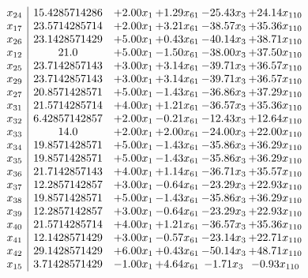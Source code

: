 \documentclass[8pt]{article}
\begin{document}
\[\begin{array}{c| c c@{\hskip 2pt} c@{\hskip 2pt} c@{\hskip 2pt} c@{\hskip 2pt} }
 x_{24}   &  15.4285714286 & +  2.00 x_{1} & +  1.29 x_{61} & -25.43 x_{3} & + 24.14 x_{110}\\
 x_{17}   &  23.5714285714 & +  2.00 x_{1} & +  3.21 x_{61} & -38.57 x_{3} & + 35.36 x_{110}\\
 x_{26}   &  23.1428571429 & +  5.00 x_{1} & +  0.43 x_{61} & -40.14 x_{3} & + 38.71 x_{110}\\
 x_{12}   &  21.0 & +  5.00 x_{1} & -1.50 x_{61} & -38.00 x_{3} & + 37.50 x_{110}\\
 x_{25}   &  23.7142857143 & +  3.00 x_{1} & +  3.14 x_{61} & -39.71 x_{3} & + 36.57 x_{110}\\
 x_{29}   &  23.7142857143 & +  3.00 x_{1} & +  3.14 x_{61} & -39.71 x_{3} & + 36.57 x_{110}\\
 x_{27}   &  20.8571428571 & +  5.00 x_{1} & -1.43 x_{61} & -36.86 x_{3} & + 37.29 x_{110}\\
 x_{31}   &  21.5714285714 & +  4.00 x_{1} & +  1.21 x_{61} & -36.57 x_{3} & + 35.36 x_{110}\\
 x_{32}   &  6.42857142857 & +  2.00 x_{1} & -0.21 x_{61} & -12.43 x_{3} & + 12.64 x_{110}\\
 x_{33}   &  14.0 & +  2.00 x_{1} & +  2.00 x_{61} & -24.00 x_{3} & + 22.00 x_{110}\\
 x_{34}   &  19.8571428571 & +  5.00 x_{1} & -1.43 x_{61} & -35.86 x_{3} & + 36.29 x_{110}\\
 x_{35}   &  19.8571428571 & +  5.00 x_{1} & -1.43 x_{61} & -35.86 x_{3} & + 36.29 x_{110}\\
 x_{36}   &  21.7142857143 & +  4.00 x_{1} & +  1.14 x_{61} & -36.71 x_{3} & + 35.57 x_{110}\\
 x_{37}   &  12.2857142857 & +  3.00 x_{1} & -0.64 x_{61} & -23.29 x_{3} & + 22.93 x_{110}\\
 x_{38}   &  19.8571428571 & +  5.00 x_{1} & -1.43 x_{61} & -35.86 x_{3} & + 36.29 x_{110}\\
 x_{39}   &  12.2857142857 & +  3.00 x_{1} & -0.64 x_{61} & -23.29 x_{3} & + 22.93 x_{110}\\
 x_{40}   &  21.5714285714 & +  4.00 x_{1} & +  1.21 x_{61} & -36.57 x_{3} & + 35.36 x_{110}\\
 x_{41}   &  12.1428571429 & +  3.00 x_{1} & -0.57 x_{61} & -23.14 x_{3} & + 22.71 x_{110}\\
 x_{42}   &  29.1428571429 & +  6.00 x_{1} & +  0.43 x_{61} & -50.14 x_{3} & + 48.71 x_{110}\\
 x_{15}   &  3.71428571429 & -1.00 x_{1} & +  4.64 x_{61} & -1.71 x_{3} & -0.93 x_{110}\\

\end{array}\]
\end{document}

